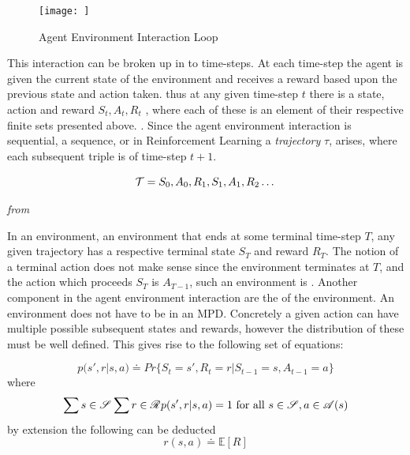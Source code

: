 \begin{figure}[h!]
    \centering
    \texttt{[image: ]}
    \caption{Agent Environment Interaction Loop}
    \label{fig:agent_env_inter}
\end{figure}

This interaction can be broken up in to time-steps. At each time-step the agent is given the current state of the environment and receives a reward based upon the previous state and action taken. thus at any given time-step $t$ there is a state, action and reward $S_t, A_t, R_t$ , where each of these is an element of their respective finite sets presented above. . Since the agent environment interaction is sequential, a sequence, or in Reinforcement Learning a \textit{trajectory} $\tau$, arises, where each subsequent triple is of time-step $t+1$. 

\begin{equation}\label{MDP:trajectory}
    \mathcal{T} = S_0, A_0, R_1, S_1, A_1, R_2 \dots
\end{equation}
\centerline{\small\textit{from }}

In an  environment, an environment that ends at some terminal time-step $T$, any given trajectory has a respective terminal state $S_T$ and reward $R_T$. The notion of a terminal action does not make sense since the environment terminates at $T$, and the action which proceeds $S_T$ is $A_{T-1}$, such an environment is . Another component in the agent environment interaction are the  of the environment. An environment does not have to be  in an MPD. Concretely a given action can have multiple possible subsequent states and rewards, however the distribution of these must be well defined. This gives rise to the following set of equations:

\begin{equation}\label{MDP:prob_dist:0}
    p(s', r |s, a) \doteq Pr\{ S_t=s', R_t=r | S_{t-1}=s, A_{t-1}=a\}
\end{equation}
where 
\begin{equation}\label{MDP:prob_dist:1}
    \sum{s \in \mathscr{S}}^{}\sum{r \in \mathscr{R}}^{}  p(s', r |s, a) = 1 \mathrm{\ for\ all\ } s \in \mathscr{S}, a \in \mathscr{A}(s) 
\end{equation}
by extension the following can be deducted
\begin{equation}\label{MDP:prob_dist:2}
    r(s, a) \doteq \mathbb{E}[R]
\end{equation}


